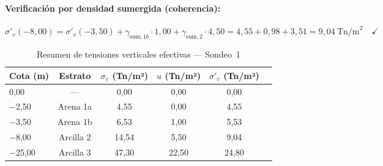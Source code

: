 \paragraph{Verificación por densidad sumergida (coherencia):}
\[
  \sigma'_v(-8{,}00) = \sigma'_v(-3{,}50)
    + \gamma_{\text{sum},1b} \cdot 1{,}00
    + \gamma_{\text{sum},2} \cdot 4{,}50
  = 4{,}55 + 0{,}98 + 3{,}51 = 9{,}04~\text{Tn/m}^2 \quad\checkmark
\]

\begin{table}[H]
  \centering
  \caption{Resumen de tensiones verticales efectivas — Sondeo~1}
  \label{tab:tensiones_sondeo}
  \begin{tabular}{@{}lccccc@{}}
    \toprule
    \textbf{Cota (m)} & \textbf{Estrato}
    & $\sigma_v$ \textbf{(Tn/m²)}
    & $u$ \textbf{(Tn/m²)}
    & $\sigma'_v$ \textbf{(Tn/m²)} \\
    \midrule
    0{,}00           & —           &  0{,}00 & 0{,}00 & 0{,}00 \\
    $-$2{,}50        & Arena 1a    &  4{,}55 & 0{,}00 & 4{,}55 \\
    $-$3{,}50        & Arena 1b    &  6{,}53 & 1{,}00 & 5{,}53 \\
    $-$8{,}00        & Arcilla 2   & 14{,}54 & 5{,}50 & 9{,}04 \\
    $-$25{,}00       & Arcilla 3   & 47{,}30 &22{,}50 &24{,}80 \\
    \bottomrule
  \end{tabular}
\end{table}

